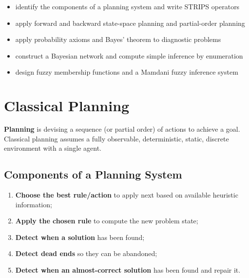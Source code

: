 
\begin{outcome}
\begin{itemize}
\item identify the components of a planning system and write STRIPS operators 
\item apply forward and backward state-space planning and partial-order planning 
\item apply probability axioms and Bayes' theorem to diagnostic problems 
\item construct a Bayesian network and compute simple inference by enumeration 
\item design fuzzy membership functions and a Mamdani fuzzy inference system 
\end{itemize}
\end{outcome}

\section{Classical Planning}
\textbf{Planning} is devising a sequence (or partial order) of actions to achieve a goal. Classical planning assumes a fully observable, deterministic, static, discrete environment with a single agent.

\subsection{Components of a Planning System}
\begin{enumerate}
\item \textbf{Choose the best rule/action} to apply next based on available heuristic information;
\item \textbf{Apply the chosen rule} to compute the new problem state;
\item \textbf{Detect when a solution} has been found;
\item \textbf{Detect dead ends} so they can be abandoned;
\item \textbf{Detect when an almost-correct solution} has been found and repair it.
\end{enumerate}

